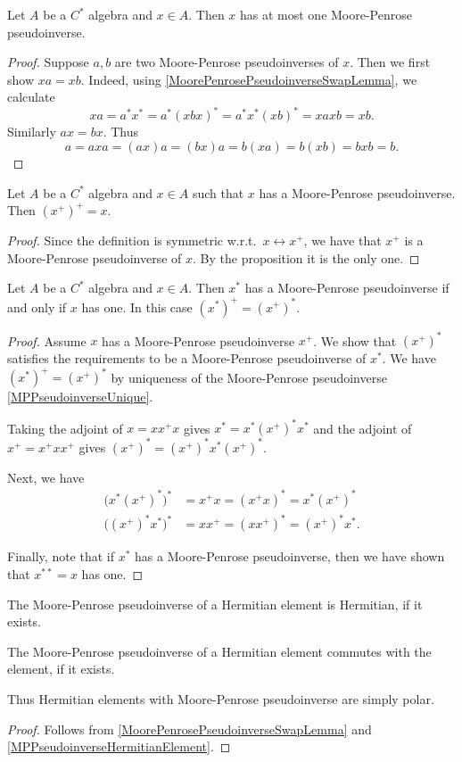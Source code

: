 \begin{proposition} \label{MPPseudoinverseUnique}
Let $A$ be a $C^*$ algebra and $x\in A$. Then $x$ has at most one Moore-Penrose pseudoinverse.
\end{proposition}
\begin{proof}
Suppose $a,b$ are two Moore-Penrose pseudoinverses of $x$. Then we first show $xa = xb$. Indeed, using \ref{MoorePenrosePseudoinverseSwapLemma}, we calculate
\[ xa = a^*x^* = a^*(xbx)^* = a^*x^*(xb)^* = xaxb = xb. \]
Similarly $ax = bx$. Thus
\[ a = axa = (ax)a = (bx)a = b(xa) = b(xb) = bxb = b. \]
\end{proof}
\begin{corollary}
Let $A$ be a $C^*$ algebra and $x\in A$ such that $x$ has a Moore-Penrose pseudoinverse. Then $(x^+)^+ = x$.
\end{corollary}
\begin{proof}
Since the definition is symmetric w.r.t.\ $x\leftrightarrow x^+$, we have that $x^+$ is a Moore-Penrose pseudoinverse of $x$. By the proposition it is the only one.
\end{proof}

\begin{lemma} \label{MPPseudoinverseAdjoint}
Let $A$ be a $C^*$ algebra and $x\in A$. Then $x^*$ has a Moore-Penrose pseudoinverse \textup{if and only if} $x$ has one. In this case $(x^*)^+ = (x^+)^*$.
\end{lemma}
\begin{proof}
Assume $x$ has a Moore-Penrose pseudoinverse $x^+$. We show that $(x^+)^*$ satisfies the requirements to be a Moore-Penrose pseudoinverse of $x^*$. We have $(x^*)^+ = (x^+)^*$ by uniqueness of the Moore-Penrose pseudoinverse \ref{MPPseudoinverseUnique}.

Taking the adjoint of $x = xx^+x$ gives $x^* = x^*(x^+)^*x^*$ and the adjoint of $x^+ = x^+xx^+$ gives $(x^+)^* = (x^+)^*x^*(x^+)^*$.

Next, we have
\begin{align*}
\big(x^*(x^+)^*\big)^* &= x^+x = (x^+x)^* = x^*(x^+)^* \\
\big((x^+)^*x^*\big)^* &= xx^+ = (xx^+)^* = (x^+)^*x^*.
\end{align*}

Finally, note that if $x^*$ has a Moore-Penrose pseudoinverse, then we have shown that $x^{**} = x$ has one.
\end{proof}
\begin{corollary} \label{MPPseudoinverseHermitianElement}
The Moore-Penrose pseudoinverse of a Hermitian element is Hermitian, if it exists.
\end{corollary}
\begin{corollary}
The Moore-Penrose pseudoinverse of a Hermitian element commutes with the element, if it exists.
\end{corollary}
Thus Hermitian elements with Moore-Penrose pseudoinverse are simply polar.
\begin{proof}
Follows from \ref{MoorePenrosePseudoinverseSwapLemma} and \ref{MPPseudoinverseHermitianElement}.
\end{proof}

